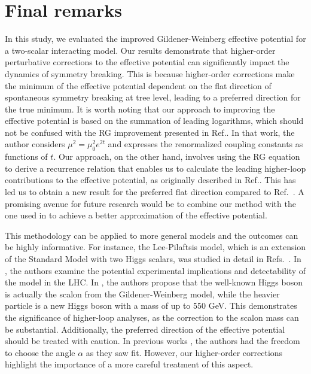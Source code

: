 \documentclass[11pt,a4paper,english,superscriptaddress,preprint,aps,prd]{revtex4}
\begin{document}
\section{Final remarks}\label{Conclusions}

In this study, we evaluated the improved Gildener-Weinberg effective potential for a two-scalar interacting model. Our results demonstrate that higher-order perturbative corrections to the effective potential can significantly impact the dynamics of symmetry breaking. This is because higher-order corrections make the minimum of the effective potential dependent on the flat direction of spontaneous symmetry breaking at tree level, leading to a preferred direction for the true minimum. {It is worth noting that our approach to improving the effective potential is based on the summation of leading logarithms, which should not be confused with the RG improvement presented in Ref.\cite{Ookane:2019iwq}. In that work, the author considers $\mu^2 = \mu_0^2e^{2t}$ and expresses the renormalized coupling constants as functions of $t$. Our approach, on the other hand, involves using the RG equation to derive a recurrence relation that enables us to calculate the leading higher-loop contributions to the effective potential, as originally described in Ref.\cite{McKeon:1998tr}. This has led us to obtain a new result for the preferred flat direction compared to Ref.~\cite{Ookane:2019iwq}. A promising avenue for future research would be to combine our method with the one used in \cite{Ookane:2019iwq} to achieve a better approximation of the effective potential.}

This methodology can be applied to more general models and the outcomes can be highly informative. For instance, the Lee-Pilaftsis model, which is an extension of the Standard Model with two Higgs scalars, was studied in detail in Refs.~\cite{Lee:2012jn,Lane:2018ycs,Lane:2019dbc}. In \cite{Lane:2018ycs}, the authors examine the potential experimental implications and detectability of the model in the LHC. In \cite{Lane:2019dbc}, the authors propose that the well-known Higgs boson is actually the scalon from the Gildener-Weinberg model, while the heavier particle is a new Higgs boson with a mass of up to 550 GeV. This demonstrates the significance of higher-loop analyses, as the correction to the scalon mass can be substantial. Additionally, the preferred direction of the effective potential should be treated with caution. In previous works \cite{Lee:2012jn,Lane:2018ycs,Lane:2019dbc}, the authors had the freedom to choose the angle $\alpha$ as they saw fit. However, our higher-order corrections highlight the importance of a more careful treatment of this aspect.
\end{document}

